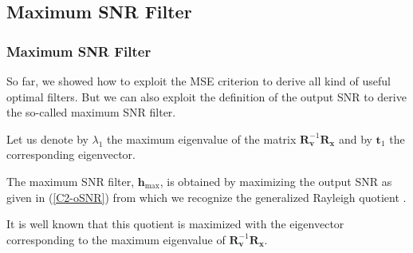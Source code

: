\documentclass[10pt,pdflatex,headrule,landscape]{beamer}
\begin{document}
\subsection{Maximum SNR Filter}
\begin{frame}
    \frametitle{Maximum SNR Filter}

So far, we showed how to exploit the MSE criterion to derive all kind of useful optimal filters. But we can also exploit the definition of the output SNR to derive the so-called maximum SNR filter.

Let us denote by $\lambda_1$ the maximum eigenvalue of the matrix $\mathbf{R}_{\mathbf{v}}^{-1} \mathbf{R}_{\mathbf{x}}$ and by $\mathbf{t}_1$ the corresponding eigenvector.

The maximum SNR filter, $\mathbf{h}_{\mathrm{max}}$, is obtained by maximizing the output SNR as given in (\ref{C2-oSNR}) from which we recognize the generalized Rayleigh quotient \cite{C2-golub1996}.

It is well known that this quotient is maximized with the eigenvector corresponding to the maximum eigenvalue of $\mathbf{R}_{\mathbf{v}}^{-1} \mathbf{R}_{\mathbf{x}}$.

\end{frame}
\end{document}
